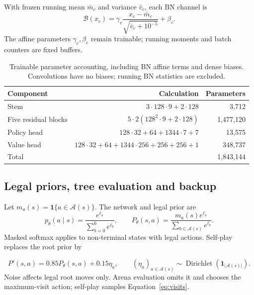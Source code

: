 \documentclass[letterpaper]{article}
\begin{document}
With frozen running mean $\bar m_c$ and variance $\bar v_c$, each BN channel is
\begin{equation}
 \mathcal B(x_c)=\gamma_c\frac{x_c-\bar m_c}
 {\sqrt{\bar v_c+10^{-5}}}+\beta_c.
 \label{eq:frozen-bn}
\end{equation}
The affine parameters $\gamma_c,\beta_c$ remain trainable; running moments and
batch counters are fixed buffers.

\begin{table}[htbp]
\centering\small
\caption{Trainable parameter accounting, including BN affine terms and dense
biases. Convolutions have no biases; running BN statistics are excluded.}
\label{tab:parameters}
\begin{tabular}{@{}lrr@{}}
\toprule
Component & Calculation & Parameters\\
\midrule
Stem & $3\cdot128\cdot9+2\cdot128$ & 3,712\\
Five residual blocks & $5\cdot2(128^2\cdot9+2\cdot128)$ & 1,477,120\\
Policy head & $128\cdot32+64+1344\cdot7+7$ & 13,575\\
Value head & $128\cdot32+64+1344\cdot256+256+256+1$ & 348,737\\
\midrule
Total & & 1,843,144\\
\bottomrule
\end{tabular}
\end{table}

\subsection{Legal priors, tree evaluation and backup}
\label{app:search-math}
Let $m_a(s)=\mathbf1\{a\in\mathcal A(s)\}$. The network and legal prior are
\begin{equation}
 p_\theta(a\mid s)=\frac{e^{\ell_a}}{\sum_{b=0}^{6}e^{\ell_b}},\qquad
 P_\theta(s,a)=\frac{m_a(s)e^{\ell_a}}
 {\sum_{b\in\mathcal A(s)}e^{\ell_b}}.
 \label{eq:policy-prior}
\end{equation}
Masked softmax applies to non-terminal states with legal actions. Self-play
replaces the root prior by

\begin{equation}
 P'(s,a)=0.85P_\theta(s,a)+0.15\eta_a,\qquad
 (\eta_a)_{a\in\mathcal A(s)}\sim
 \operatorname{Dirichlet}(\mathbf1_{|\mathcal A(s)|}).
 \label{eq:root-noise}
\end{equation}
Noise affects legal root moves only. Arena evaluation omits it and chooses the
maximum-visit action; self-play samples Equation~\eqref{eq:visits}.
\end{document}
